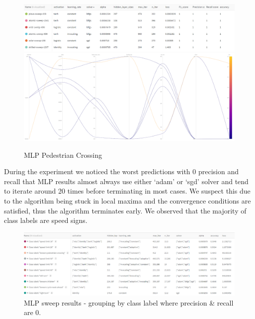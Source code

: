 \documentclass[11pt]{article}
\begin{document}
\begin{figure}[H]
  \centering 
  \includegraphics[width = \textwidth, height = 0.25\textwidth, keepaspectratio]{Images/MLPPedCrossingTable.png} 
  \includegraphics[width = \textwidth, height = 0.4\textwidth, keepaspectratio]{Images/MLPedCrossingGraph.png} 
  \caption {MLP Pedestrian Crossing} \label{MLPPedCrossing}
\end{figure}
\FloatBarrier

During the experiment we noticed the worst predictions with 0 precision and recall that MLP results almost always use either ‘adam’ or ‘sgd’ solver and tend to iterate around 20 times before terminating in most cases. We suspect this due to the algorithm being stuck in local maxima and the convergence conditions are satisfied, thus the algorithm terminates early. We observed that the majority of class labels are speed signs. 

\begin{figure}[H]
  \centering 
  \includegraphics[width = \textwidth, height = 0.5\textwidth, keepaspectratio]{Images/MLPSweepResults-precAndRecall.png} 
  \caption {MLP sweep results - grouping by class label where precision \& recall are 0.} \label{MLPSweepResults}
\end{figure}
\FloatBarrier
\end{document}
